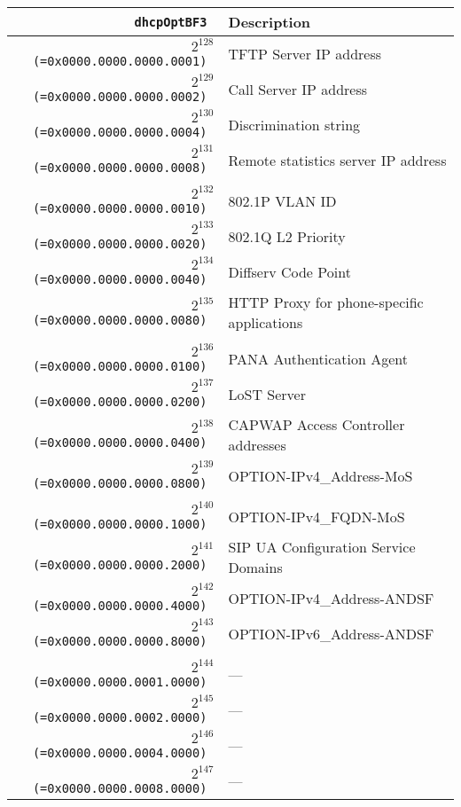 \documentclass[documentation]{subfiles}
\begin{document}
\begin{small}
    \begin{longtable}{>{\tt}rl}
        \toprule
        {\bf dhcpOptBF3} & {\bf Description}\\
        \midrule\endhead%
        $2^{128}$ (=0x0000.0000.0000.0001) & TFTP Server IP address \\
        $2^{129}$ (=0x0000.0000.0000.0002) & Call Server IP address \\
        $2^{130}$ (=0x0000.0000.0000.0004) & Discrimination string \\
        $2^{131}$ (=0x0000.0000.0000.0008) & Remote statistics server IP address \\
        \\
        $2^{132}$ (=0x0000.0000.0000.0010) & 802.1P VLAN ID \\
        $2^{133}$ (=0x0000.0000.0000.0020) & 802.1Q L2 Priority \\
        $2^{134}$ (=0x0000.0000.0000.0040) & Diffserv Code Point \\
        $2^{135}$ (=0x0000.0000.0000.0080) & HTTP Proxy for phone-specific applications \\
        \\
        $2^{136}$ (=0x0000.0000.0000.0100) & PANA Authentication Agent \\
        $2^{137}$ (=0x0000.0000.0000.0200) & LoST Server \\
        $2^{138}$ (=0x0000.0000.0000.0400) & CAPWAP Access Controller addresses \\
        $2^{139}$ (=0x0000.0000.0000.0800) & OPTION-IPv4\_Address-MoS \\
        \\
        $2^{140}$ (=0x0000.0000.0000.1000) & OPTION-IPv4\_FQDN-MoS \\
        $2^{141}$ (=0x0000.0000.0000.2000) & SIP UA Configuration Service Domains \\
        $2^{142}$ (=0x0000.0000.0000.4000) & OPTION-IPv4\_Address-ANDSF \\
        $2^{143}$ (=0x0000.0000.0000.8000) & OPTION-IPv6\_Address-ANDSF \\
        \\
        $2^{144}$ (=0x0000.0000.0001.0000) & --- \\
        $2^{145}$ (=0x0000.0000.0002.0000) & --- \\
        $2^{146}$ (=0x0000.0000.0004.0000) & --- \\
        $2^{147}$ (=0x0000.0000.0008.0000) & --- \\

\end{longtable}
\end{small}
\end{document}
